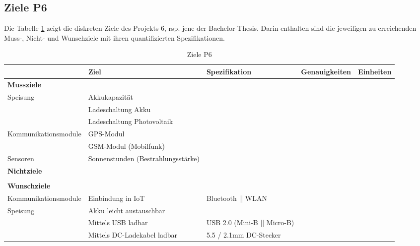 \begin{landscape}
\subsection{Ziele P6}
Die Tabelle \ref{tab:ZieleP6} zeigt die diskreten Ziele des Projekts 6, rsp. jene der Bachelor-Thesis. Darin enthalten sind die jeweiligen zu erreichenden Muss-, Nicht- und Wunschziele mit ihren quantifizierten Spezifikationen.\\

\begin{table}[htbp]
  \centering
  \renewcommand{\arraystretch}{1.4}
  \caption{Ziele P6}
    \begin{tabular}{l|l|l|r|r}
          & \textbf{Ziel} & \multicolumn{1}{l|}{\textbf{Spezifikation}} & \multicolumn{1}{l|}{\textbf{Genauigkeiten}} & \multicolumn{1}{l}{\textbf{Einheiten}} \\
    \toprule
    \multicolumn{1}{l}{\textbf{Mussziele}} & \multicolumn{1}{r}{} & \multicolumn{1}{r}{} & \multicolumn{1}{r}{} &  \\
    \toprule
    \multirow{3}{*}{Speisung} & Akkukapazität &       &       &  \\
\cline{2-5}          & Ladeschaltung Akku &       &       &  \\
\cline{2-5}           & Ladeschaltung Photovoltaik &       &       &  \\
    \hline
    \multirow{2}{*}{Kommunikationsmodule} & GPS-Modul   &       &       &  \\
\cline{2-5}          & GSM-Modul (Mobilfunk) &       &       &  \\
\hline
Sensoren & Sonnenstunden (Bestrahlungsstärke) &       &       &  \\
    \bottomrule
    \multicolumn{1}{l}{\textbf{Nichtziele}} & \multicolumn{1}{r}{} & \multicolumn{1}{r}{} & \multicolumn{1}{r}{} &  \\
    \toprule
    & & & & \\
    \bottomrule
    \multicolumn{1}{l}{\textbf{Wunschziele}} & \multicolumn{1}{r}{} & \multicolumn{1}{r}{} & \multicolumn{1}{r}{} &  \\
    \toprule
    Kommunikationsmodule & Einbindung in IoT &       Bluetooth || WLAN &       &  \\
    \hline
    \multirow{3}{*}{Speisung} & Akku leicht austauschbar &       &       &  \\
\cline{2-5}  & Mittels USB ladbar & USB 2.0 (Mini-B || Micro-B) &       &  \\
\cline{2-5}  & Mittels DC-Ladekabel ladbar &      5.5 / 2.1mm DC-Stecker &       &  \\
    \bottomrule
    \end{tabular}%
  \label{tab:ZieleP6}%
\end{table}%

\end{landscape}
